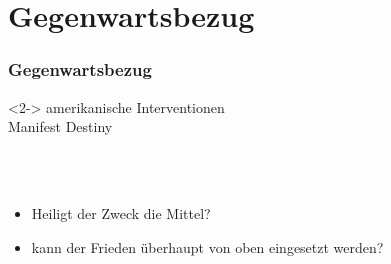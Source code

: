 \section{Gegenwartsbezug}
\begin{frame}
	\frametitle{Gegenwartsbezug}
	\begin{eg}<2->
		amerikanische Interventionen\\
		\glqq Manifest Destiny\grqq
	\end{eg}
\ \\\ \\
	\begin{itemize}
		\item<3-> Heiligt der Zweck die Mittel?
		\item<4-> kann der Frieden überhaupt von oben eingesetzt werden?
	\end{itemize}
\end{frame}